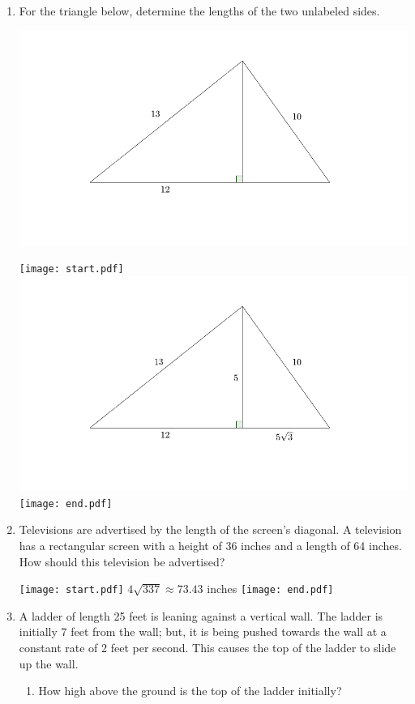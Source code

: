 \documentclass[12pt]{article}
\begin{document}
\begin{enumerate}

\item For the triangle below, determine the lengths of the two unlabeled sides.
\begin{center}
\includegraphics[scale=.8]{triangle1.pdf}
\end{center}

\texttt{[image: start.pdf]}
{{\includegraphics[scale=0.6]{triangle2.pdf}}}
\texttt{[image: end.pdf]}


\item Televisions are advertised by the length of the screen's diagonal.  A television has a rectangular screen with a height of 36 inches and a length of 64 inches.  How should this television be advertised?

\texttt{[image: start.pdf]}
{{$4\sqrt{337}\approx73.43$ inches}}
\texttt{[image: end.pdf]}


\item A ladder of length 25 feet is leaning against a vertical wall.  The ladder is initially 7 feet from the wall; but, it is being pushed towards the wall at a constant rate of 2 feet per second.  This causes the top of the ladder to slide up the wall. 
\begin{enumerate}
\item How high above the ground is the top of the ladder initially?


\end{enumerate}
\end{enumerate}
\end{document}
